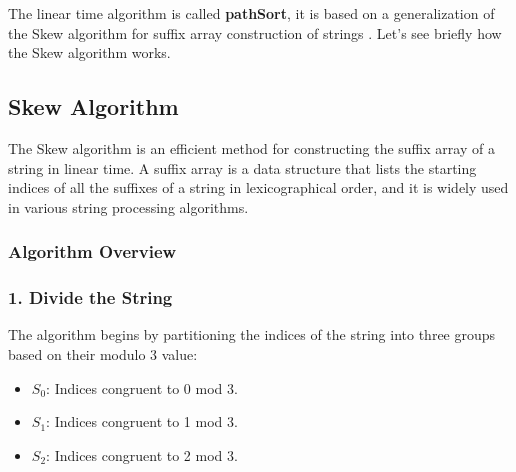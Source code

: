 The linear time algorithm is called \textbf{pathSort}, it is based on a generalization of the Skew algorithm for suffix array construction of strings \cite{karkkainen2006linear}. Let's see briefly how the Skew algorithm works.

\subsection{Skew Algorithm}
The Skew algorithm is an efficient method for constructing the suffix array of a string in linear time. A suffix array is a data structure that lists the starting indices of all the suffixes of a string in lexicographical order, and it is widely used in various string processing algorithms.

\subsubsection*{Algorithm Overview}

\subsubsection*{1. Divide the String}

The algorithm begins by partitioning the indices of the string into three groups based on their modulo 3 value:
\begin{itemize}
    \item $S_0$: Indices congruent to 0 mod 3.
    \item $S_1$: Indices congruent to 1 mod 3.
    \item $S_2$: Indices congruent to 2 mod 3.
\end{itemize}

